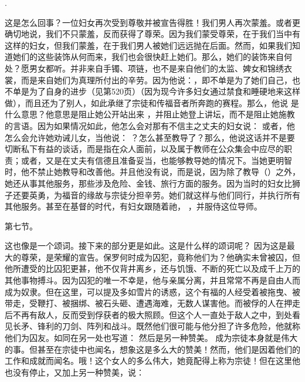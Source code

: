 . \par

这是怎么回事？一位妇女再次受到尊敬并被宣告得胜！我们男人再次蒙羞。或者更确切地说，我们不只蒙羞，反而获得了尊荣。因为我们蒙受尊荣，在于我们当中有这样的妇女，但我们蒙羞，在于我们男人被她们远远抛在后面。然而，如果我们知道她们的这些装饰从何而来，我们也会很快赶上她们。那么，她们的装饰来自何处？愿男女都听。并非来自手镯、项链，也不是来自他们的太监、婢女和锦绣衣裳，而是来自她们为真理所付出的辛劳。因为他说：，即不单是为了她们自己，也不单是为了自身的进步（见第520页）（因为现今许多妇女通过禁食和睡硬地来这样做），而且还为了别人，如此承继了宗徒和传福音者所奔跑的赛程。那么，他说  是什么意思？他意思是阻止她公开站出来 ，并阻止她登上讲坛，而不是阻止她施教的言语。因为如果情况如此，他怎么会对那有不信主之丈夫的妇女说：  或者，他怎么会允许她劝诫儿女，当他说： ？怎么甚至教导了？那么，他说这话并不是要切断私下有益的谈话，而是指在众人面前，以及属于教师在公众集会中应尽的职责；或者，又是在丈夫有信德且准备妥当，也能够教导她的情况下。当她更明智时，他不禁止她教导和改善他。并且他没有说，而是说，因为除了教导（）之外，她还从事其他服务，那些涉及危险、金钱、旅行方面的服务。因为当时的妇女比狮子还要英勇，为福音的缘故与宗徒分担辛劳。她们就这样与他们同行，并执行所有其他服务。甚至在基督的时代，有妇女跟随着祂， ，并服侍这位导师。\par

第七节。 \par

这也像是一个颂词。接下来的部分更是如此。这是什么样的颂词呢？ 因为这是最大的尊荣，是荣耀的宣告。保罗何时成为囚犯，竟称他们为？他确实未曾被囚，但他所遭受的比囚犯更甚，他不仅背井离乡，还与饥饿、不断的死亡以及成千上万的其他事物搏斗。因为囚犯的唯一不幸是，他与亲属分离，并且常常不再是自由人而成为奴隶。但在这里，可以提及多如雪片的诱惑，这个有福的人经受着被拖曳、被带走，受鞭打、被捆绑、被石头砸、遭遇海难，无数人谋害他。而被俘的人在押走后不再有敌人，反而受到俘获者的极大照顾。但这个人一直处于敌人之中，到处看见长矛、锋利的刀剑、阵列和战斗。既然他们很可能与他分担了许多危险，他就称他们为囚友。如同在另一处也写道：  然后是另一种赞美。 成为宗徒本身就是伟大的事。但甚至在宗徒中也闻名，想象这是多么大的赞美！然而，他们是因着他们的工作和成就而闻名。哦！这个女人的多么伟大，她竟配得上称为宗徒！但在这里他也没有停止，又加上另一种赞美，说：\par

